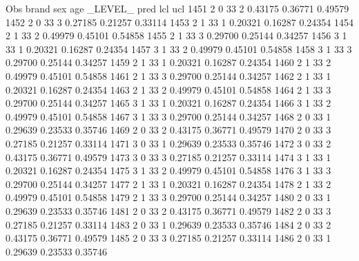 \documentclass{article}
\begin{document}
\begin{Woutput}
 Obs    brand    sex    age    _LEVEL_      pred       lcl        ucl
1451      2       0      33       2       0.43175    0.36771    0.49579
1452      2       0      33       3       0.27185    0.21257    0.33114
1453      2       1      33       1       0.20321    0.16287    0.24354
1454      2       1      33       2       0.49979    0.45101    0.54858
1455      2       1      33       3       0.29700    0.25144    0.34257
1456      3       1      33       1       0.20321    0.16287    0.24354
1457      3       1      33       2       0.49979    0.45101    0.54858
1458      3       1      33       3       0.29700    0.25144    0.34257
1459      2       1      33       1       0.20321    0.16287    0.24354
1460      2       1      33       2       0.49979    0.45101    0.54858
1461      2       1      33       3       0.29700    0.25144    0.34257
1462      2       1      33       1       0.20321    0.16287    0.24354
1463      2       1      33       2       0.49979    0.45101    0.54858
1464      2       1      33       3       0.29700    0.25144    0.34257
1465      3       1      33       1       0.20321    0.16287    0.24354
1466      3       1      33       2       0.49979    0.45101    0.54858
1467      3       1      33       3       0.29700    0.25144    0.34257
1468      2       0      33       1       0.29639    0.23533    0.35746
1469      2       0      33       2       0.43175    0.36771    0.49579
1470      2       0      33       3       0.27185    0.21257    0.33114
1471      3       0      33       1       0.29639    0.23533    0.35746
1472      3       0      33       2       0.43175    0.36771    0.49579
1473      3       0      33       3       0.27185    0.21257    0.33114
1474      3       1      33       1       0.20321    0.16287    0.24354
1475      3       1      33       2       0.49979    0.45101    0.54858
1476      3       1      33       3       0.29700    0.25144    0.34257
1477      2       1      33       1       0.20321    0.16287    0.24354
1478      2       1      33       2       0.49979    0.45101    0.54858
1479      2       1      33       3       0.29700    0.25144    0.34257
1480      2       0      33       1       0.29639    0.23533    0.35746
1481      2       0      33       2       0.43175    0.36771    0.49579
1482      2       0      33       3       0.27185    0.21257    0.33114
1483      2       0      33       1       0.29639    0.23533    0.35746
1484      2       0      33       2       0.43175    0.36771    0.49579
1485      2       0      33       3       0.27185    0.21257    0.33114
1486      2       0      33       1       0.29639    0.23533    0.35746

\end{Woutput}
\end{document}
